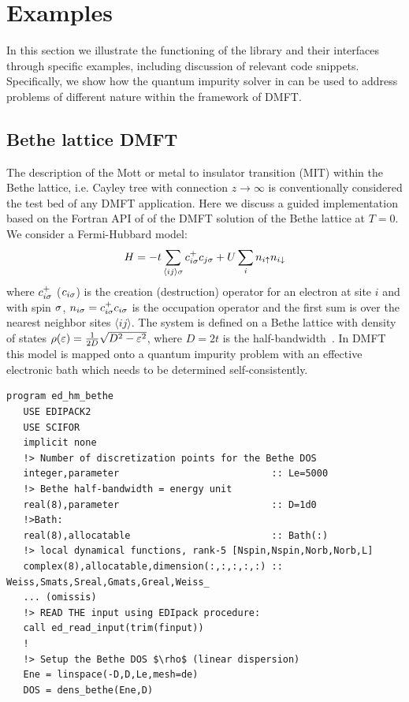 \section{Examples}\label{SecExamples}
In this section we illustrate the functioning of the \NAME
library and their interfaces through specific examples, including
discussion of relevant code snippets.
Specifically, we show how the quantum impurity solver in \NAME can be used
to address problems of different nature within the framework of DMFT. 


\subsection{Bethe lattice DMFT}\label{SecExamplesBetheDMFT}
The description of the Mott or metal to insulator transition (MIT)
within the Bethe lattice, i.e. Cayley tree with connection
$z\to\infty$ is conventionally considered the test bed of any DMFT
application. Here  we discuss a guided implementation based on the
Fortran API of \NAME of the DMFT solution of the Bethe lattice at
$T=0$. 
We consider a Fermi-Hubbard model:
$$
H = -t \sum_{\langle ij\rangle\sigma}c^+_{i\sigma}c_{j\sigma} + U \sum_i n_{i\uparrow}n_{i\downarrow}
$$
where $c^+_{i\sigma}$ ($c_{i\sigma}$) is the creation (destruction) operator for an electron at site $i$
and with spin $\sigma$, $n_{i\sigma}=c^+_{i\sigma}c_{i\sigma}$ is the occupation
operator and the first sum is over the nearest neighbor sites $\langle
ij\rangle$. 
The system is defined on a Bethe lattice with density of states
$\rho(\varepsilon)=\frac{1}{2D}\sqrt{D^2-\varepsilon^2}$, where $D=2t$ is the
half-bandwidth~\cite{Georges1996}.
In DMFT this model is mapped
onto a quantum impurity problem with an effective electronic bath
which needs to be determined self-consistently.
\begin{lstlisting}[style=fstyle,numbers=none,basicstyle={\scriptsize\ttfamily}]
program ed_hm_bethe
   USE EDIPACK2
   USE SCIFOR
   implicit none
   !> Number of discretization points for the Bethe DOS
   integer,parameter                           :: Le=5000
   !> Bethe half-bandwidth = energy unit
   real(8),parameter                           :: D=1d0
   !>Bath:
   real(8),allocatable                         :: Bath(:)
   !> local dynamical functions, rank-5 [Nspin,Nspin,Norb,Norb,L]
   complex(8),allocatable,dimension(:,:,:,:,:) :: Weiss,Smats,Sreal,Gmats,Greal,Weiss_
   ... (omissis)
   !> READ THE input using EDIpack procedure:
   call ed_read_input(trim(finput))
   !
   !> Setup the Bethe DOS $\rho$ (linear dispersion)
   Ene = linspace(-D,D,Le,mesh=de)
   DOS = dens_bethe(Ene,D)
\end{lstlisting}

